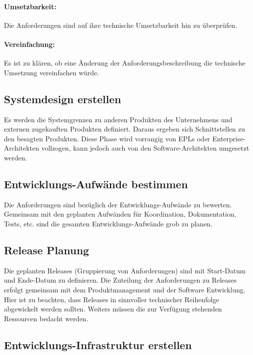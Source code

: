 \paragraph{Umsetzbarkeit:} 
Die Anforderungen sind auf ihre technische Umsetzbarkeit hin zu überprüfen.

\paragraph{Vereinfachung:} 
Es ist zu klären, ob eine Änderung der Anforderungsbeschreibung die technische Umsetzung vereinfachen würde.

\subsection{Systemdesign erstellen}

Es werden die Systemgrenzen zu anderen Produkten des Unternehmens und externen zugekauften Produkten definiert. Daraus ergeben sich Schnittstellen zu den besagten Produkten. Diese Phase wird vorrangig von \ac{EPL}s oder Enterprise-Architekten vollzogen, kann jedoch auch von den Software-Architekten umgesetzt werden.

\subsection{Entwicklungs-Aufwände bestimmen}

Die Anforderungen sind bezüglich der Entwicklungs-Aufwände zu bewerten. Gemeinsam mit den geplanten Aufwänden für Koordination, Dokumentation, Tests, etc. sind die gesamten Entwicklungs-Aufwände grob zu planen.

\subsection{Release Planung}

Die geplanten Releases (Gruppierung von Anforderungen) sind mit Start-Datum und Ende-Datum zu definieren.
Die Zuteilung der Anforderungen zu Releases erfolgt gemeinsam mit dem Produktmanagement und der Software Entwicklung. Hier ist zu beachten, dass Releases in sinnvoller technischer Reihenfolge abgewickelt werden sollten. Weiters müssen die zur Verfügung stehenden Ressourcen bedacht werden.

\subsection{Entwicklungs-Infrastruktur erstellen}

